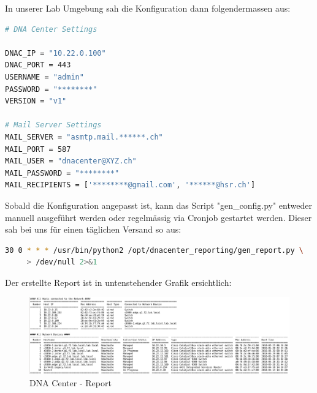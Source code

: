 In unserer Lab Umgebung sah die Konfiguration dann folgendermassen aus:

\begin{lstlisting}[language=bash]
# DNA Center Settings

DNAC_IP = "10.22.0.100"
DNAC_PORT = 443
USERNAME = "admin"
PASSWORD = "********"
VERSION = "v1"

# Mail Server Settings
MAIL_SERVER = "asmtp.mail.******.ch"
MAIL_PORT = 587
MAIL_USER = "dnacenter@XYZ.ch"
MAIL_PASSWORD = "********"
MAIL_RECIPIENTS = ['********@gmail.com', '******@hsr.ch']
\end{lstlisting}

Sobald die Konfiguration angepasst ist, kann das Script "gen\_config.py" entweder manuell ausgeführt werden oder regelmässig via Cronjob gestartet werden. Dieser sah bei uns für einen täglichen Versand so aus:

\begin{lstlisting}[language=bash]
30 0 * * * /usr/bin/python2 /opt/dnacenter_reporting/gen_report.py \
     > /dev/null 2>&1
\end{lstlisting}

Der erstellte Report ist in untenstehender Grafik ersichtlich:

\begin{figure}[H]
	\centering
	\includegraphics[width=17cm]{img/secondtry/report.png}
	\caption{DNA Center - Report}
	\label{fig:Report}
\end{figure}